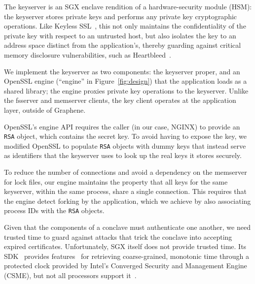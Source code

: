 %
The keyserver is an SGX enclave rendition of a hardware-security module
(HSM): the keyserver stores private keys and performs any private key
cryptographic operations.
%
Like Keyless SSL~\cite{keyless-ssl}, this not only maintains the
confidentiality of the private key with respect to an untrusted host,
but also isolates the key to an address space distinct from the
application's, thereby guarding against critical memory disclosure
vulnerabilities, such as Heartbleed~\cite{heartbleed-cve}.


We implement the keyserver as two components: the keyserver proper, and an
OpenSSL engine (``engine'' in Figure~\ref{fig:design}) that the application
loads as a shared library; the engine proxies private key operations to the
keyserver.
%
Unlike the fsserver and memserver clients, the key client operates at
the application layer, outside of Graphene.


OpenSSL's engine API requires the caller (in our case, NGINX) to provide an
\texttt{RSA} object, which contains the secret key.
%
To avoid having to expose the key, we modified OpenSSL to populate
\texttt{RSA} objects with dummy keys that instead serve as identifiers
that the keyserver uses to look up the real keys it stores securely.


To reduce the number of connections and avoid a dependency on the memserver for
lock files, our engine maintains the property that all keys for the same
keyserver, within the same process, share a single connection.
%
This requires that the engine detect forking by the application, which we
achieve by also associating process IDs with the \texttt{RSA} objects.


%
Given that the components of a conclave must authenticate one another,
we need trusted time to guard against attacks that 
trick the conclave into accepting expired certificates.
%
Unfortunately, SGX itself does not provide trusted time.  
%
Its SDK~\cite{sgx-linux-sdk} provides features~\cite{sgx-trusted-time}
for retrieving coarse-grained, monotonic time through a protected clock
provided by Intel's Converged Security and Management Engine (CSME),
but not all processors support it~\cite{ayeks-sgx-hardware}.
%



